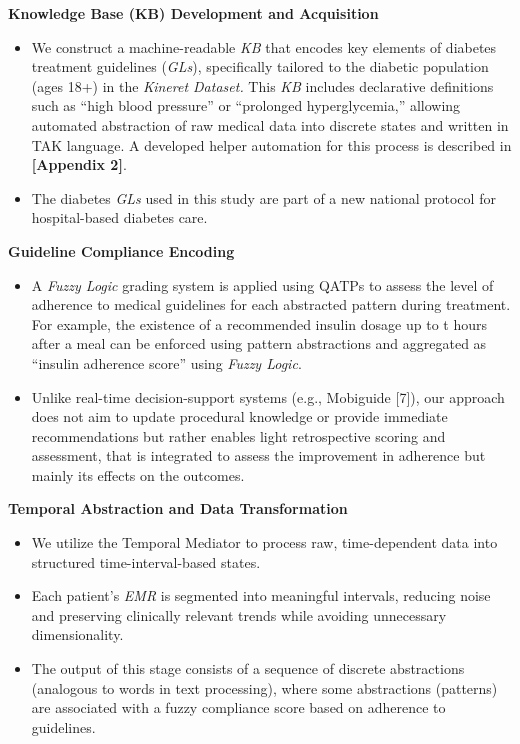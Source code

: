 \documentclass[
]{article}
\begin{document}
\textbf{Knowledge Base (KB) Development and Acquisition}

\begin{itemize}
\item
  We construct a machine-readable \emph{KB} that encodes key elements of
  diabetes treatment guidelines (\emph{GLs}), specifically tailored to
  the diabetic population (ages 18+) in the \emph{Kineret Dataset.} This
  \emph{KB} includes declarative definitions such as ``high blood
  pressure'' or ``prolonged hyperglycemia,'' allowing automated
  abstraction of raw medical data into discrete states and written in
  TAK language. A developed helper automation for this process is
  described in \textbf{{[}Appendix 2{]}}.
\item
  The diabetes \emph{GLs} used in this study are part of a new national
  protocol for hospital-based diabetes care.
\end{itemize}

\textbf{Guideline Compliance Encoding}

\begin{itemize}
\item
  A \emph{Fuzzy Logic} grading system is applied using QATPs to assess
  the level of adherence to medical guidelines for each abstracted
  pattern during treatment. For example, the existence of a recommended
  insulin dosage up to t hours after a meal can be enforced using
  pattern abstractions and aggregated as ``insulin adherence score''
  using \emph{Fuzzy Logic}.
\item
  Unlike real-time decision-support systems (e.g., Mobiguide {[}7{]}),
  our approach does not aim to update procedural knowledge or provide
  immediate recommendations but rather enables light retrospective
  scoring and assessment, that is integrated to assess the improvement
  in adherence but mainly its effects on the outcomes.
\end{itemize}

\textbf{Temporal Abstraction and Data Transformation}

\begin{itemize}
\item
  We utilize the Temporal Mediator to process raw, time-dependent data
  into structured time-interval-based states.
\item
  Each patient's \emph{EMR} is segmented into meaningful intervals,
  reducing noise and preserving clinically relevant trends while
  avoiding unnecessary dimensionality.
\item
  The output of this stage consists of a sequence of discrete
  abstractions (analogous to words in text processing), where some
  abstractions (patterns) are associated with a fuzzy compliance score
  based on adherence to guidelines.
\end{itemize}
\end{document}

